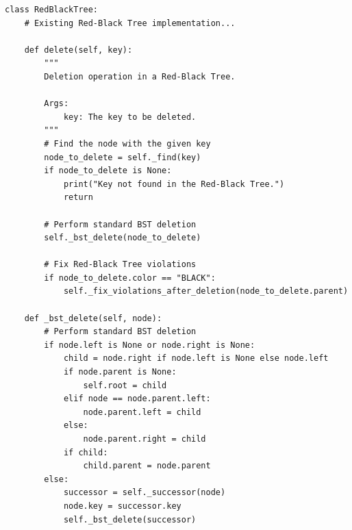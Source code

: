 \documentclass[12pt]{book} %
\begin{document}
\begin{lstlisting}
class RedBlackTree:
    # Existing Red-Black Tree implementation...

    def delete(self, key):
        """
        Deletion operation in a Red-Black Tree.

        Args:
            key: The key to be deleted.
        """
        # Find the node with the given key
        node_to_delete = self._find(key)
        if node_to_delete is None:
            print("Key not found in the Red-Black Tree.")
            return

        # Perform standard BST deletion
        self._bst_delete(node_to_delete)

        # Fix Red-Black Tree violations
        if node_to_delete.color == "BLACK":
            self._fix_violations_after_deletion(node_to_delete.parent)

    def _bst_delete(self, node):
        # Perform standard BST deletion
        if node.left is None or node.right is None:
            child = node.right if node.left is None else node.left
            if node.parent is None:
                self.root = child
            elif node == node.parent.left:
                node.parent.left = child
            else:
                node.parent.right = child
            if child:
                child.parent = node.parent
        else:
            successor = self._successor(node)
            node.key = successor.key
            self._bst_delete(successor)


\end{lstlisting}
\end{document}
